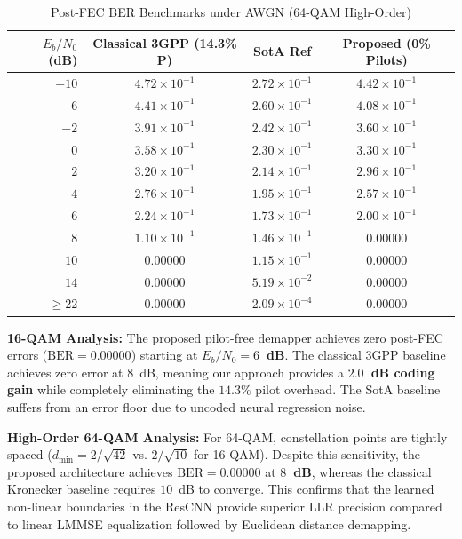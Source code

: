 ﻿\documentclass[journal,twoside]{IEEEtran}
\begin{document}
\begin{table}[t]
\caption{Post-FEC BER Benchmarks under AWGN (64-QAM High-Order)}
\label{tab:awgn_64qam}
\centering
\footnotesize
\setlength{\tabcolsep}{5pt}
\begin{tabular}{r@{\quad}ccc}
\toprule
$E_b/N_0$ (dB) & Classical 3GPP (14.3\% P) & SotA Ref \cite{ye2018} & \textbf{Proposed (0\% Pilots)} \\
\midrule
$-10$ & $4.72\times 10^{-1}$ & $2.72\times 10^{-1}$ & $4.42\times 10^{-1}$ \\
$-6$  & $4.41\times 10^{-1}$ & $2.60\times 10^{-1}$ & $4.08\times 10^{-1}$ \\
$-2$  & $3.91\times 10^{-1}$ & $2.42\times 10^{-1}$ & $3.60\times 10^{-1}$ \\
$0$   & $3.58\times 10^{-1}$ & $2.30\times 10^{-1}$ & $3.30\times 10^{-1}$ \\
$2$   & $3.20\times 10^{-1}$ & $2.14\times 10^{-1}$ & $2.96\times 10^{-1}$ \\
$4$   & $2.76\times 10^{-1}$ & $1.95\times 10^{-1}$ & $2.57\times 10^{-1}$ \\
$6$   & $2.24\times 10^{-1}$ & $1.73\times 10^{-1}$ & $2.00\times 10^{-1}$ \\
$8$   & $1.10\times 10^{-1}$ & $1.46\times 10^{-1}$ & $\mathbf{0.00000}$ \\
$10$  & $0.00000$            & $1.15\times 10^{-1}$ & $\mathbf{0.00000}$ \\
$14$  & $0.00000$            & $5.19\times 10^{-2}$ & $\mathbf{0.00000}$ \\
$\geq 22$ & $0.00000$        & $2.09\times 10^{-4}$ & $\mathbf{0.00000}$ \\
\bottomrule
\end{tabular}
\end{table}

\textbf{16-QAM Analysis:} The proposed pilot-free demapper achieves zero post-FEC errors
($\text{BER} = 0.00000$) starting at \textbf{$E_b/N_0 = 6$~dB}.
The classical 3GPP baseline achieves zero error at $8$~dB, meaning our approach provides a
\textbf{$2.0$~dB coding gain} while completely eliminating the $14.3\%$ pilot overhead.
The SotA baseline \cite{ye2018} suffers from an error floor due to uncoded neural regression noise.

\textbf{High-Order 64-QAM Analysis:} For 64-QAM, constellation points are tightly spaced
($d_{\text{min}} = 2/\sqrt{42}$ vs. $2/\sqrt{10}$ for 16-QAM).
Despite this sensitivity, the proposed architecture achieves $\text{BER} = 0.00000$ at \textbf{$8$~dB},
whereas the classical Kronecker baseline requires $10$~dB to converge.
This confirms that the learned non-linear boundaries in the ResCNN provide superior LLR precision
compared to linear LMMSE equalization followed by Euclidean distance demapping.
\end{document}
